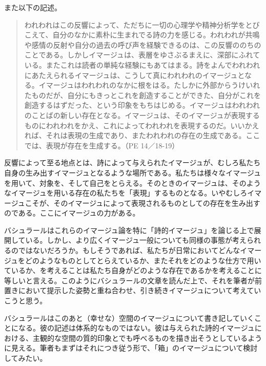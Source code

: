 \documentclass[b5j,twoside,twocolumn]{utarticle}
\begin{document}
また以下の記述。
\begin{quote}
われわれはこの反響によって、ただちに一切の心理学や精神分析学をとびこえて、自分のなかに素朴に生まれでる詩の力を感じる。われわれが共鳴や感情の反射や自分の過去の呼び声を経験できるのは、この反響ののちのことである。しかしイマージュは、表層をゆさぶるまえに、深部にふれている。またこれは読者の単純な経験にもあてはまる。詩をよんでわれわれにあたえられるイマージュは、こうして真にわれわれのイマージュとなる。イマージュはわれわれのなかに根をはる。たしかに外部からうけいれたものだが、自分にもきっとこれを創造することができた、自分がこれを創造するはずだった、という印象をもちはじめる。イマージュはわれわれのことばの新しい存在となる。イマージュは、そのイマージュが表現するものにわれわれをかえ、これによってわれわれを表現するのだ。いいかえれば、それは表現の生成であり、またわれわれの存在の生成である。ここでは、表現が存在を生成する。（PE 14／18-19）
\end{quote}

反響によって至る地点とは、詩によって与えられたイマージュが、むしろ私たち自身の生み出すイマージュとなるような場所である。私たちは様々なイマージュを用いて、対象を、そして自己をとらえる。そのときのイマージュは、そのようなイマージュを用いる存在の私たちを「表現」するものとなる。いやむしろイマージュこそが、そのイマージュによって表現されるものとしての存在を生み出すのである。ここにイマージュの力がある。


バシュラールはこれらのイマージュ論を特に「詩的イマージュ」を論じる上で展開している。しかし、より広くイマージュ一般についても同様の事態が考えられるのではないだろうか。もしそうであれば、私たちが日常においてどんなイマージュをどのようなものとしてとらえているか、またそれをどのような仕方で用いているか、を考えることは私たち自身がどのような存在であるかを考えることに等しいと言える。このようにバシュラールの文章を読んだ上で、それを筆者が前置きにおいて提示した姿勢と重ね合わせ、引き続きイマージュについて考えていこうと思う。


バシュラールはこのあと（幸せな）空間のイマージュについて書き記していくことになる。彼の記述は体系的なものではない。彼は与えられた詩的イマージュにおける、主観的な空間の質的印象とでも呼べるものを描き出そうとしているように見える。筆者もまずはそれにつき従う形で、「箱」のイマージュについて検討してみたい。
\end{document}
